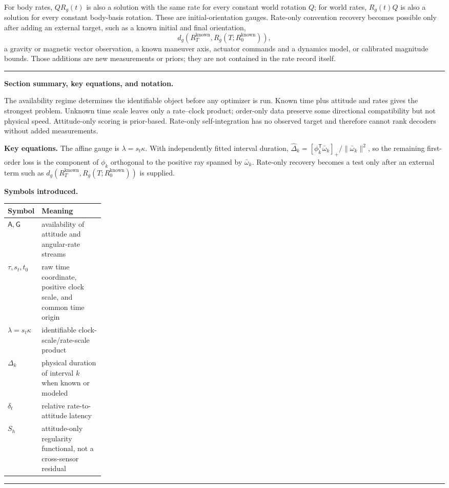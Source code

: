 \documentclass[11pt]{article}
\newenvironment{sectionrecap}
{\par\medskip\begingroup\small\noindent\rule{\linewidth}{0.4pt}\par
\smallskip\noindent\textbf{Section summary, key equations, and notation.}\par\smallskip}
{\par\smallskip\noindent\rule{\linewidth}{0.4pt}\par\endgroup\medskip}
\begin{document}
    For body rates, $Q R_g(t)$ is also a solution with the same rate for every constant world
    rotation $Q$; for world rates, $R_g(t)Q$ is also a solution for every constant body-basis
    rotation. These are initial-orientation gauges. Rate-only convention recovery becomes
    possible only after adding an external target, such as a known initial and final
    orientation,
    \begin{equation}
        d_g\!\left(R_T^{\mathrm{known}},R_g(T;R_0^{\mathrm{known}})\right),
    \end{equation}
    a gravity or magnetic vector observation, a known maneuver axis, actuator commands and a
    dynamics model, or calibrated magnitude bounds. Those additions are new measurements or
    priors; they are not contained in the rate record itself.

    \begin{sectionrecap}
        The availability regime determines the identifiable object before any optimizer is run.
        Known time plus attitude and rates gives the strongest problem. Unknown time scale leaves
        only a rate--clock product; order-only data preserve some directional compatibility but
        not physical speed. Attitude-only scoring is prior-based. Rate-only self-integration has
        no observed target and therefore cannot rank decoders without added measurements.

        \noindent\textbf{Key equations.}
        The affine gauge is \(\lambda=s_t\kappa\). With independently fitted interval duration,
        \(\widehat\Delta_k=[\phi_k^{\mathsf T}\bar\omega_k]_+/\|\bar\omega_k\|^2\), so the
        remaining first-order loss is the component of \(\phi_k\) orthogonal to the positive ray
        spanned by \(\bar\omega_k\). Rate-only recovery becomes a test only after an external
        term such as \(d_g(R_T^{\mathrm{known}},R_g(T;R_0^{\mathrm{known}}))\) is supplied.

        \noindent\textbf{Symbols introduced.}
        \par\noindent\begin{tabularx}{\linewidth}{@{}p{0.22\linewidth}Y@{}}
\toprule
Symbol & Meaning \\
\midrule
$\mathsf A,\mathsf G$ & availability of attitude and angular-rate streams \\
$\tau,s_t,t_0$ & raw time coordinate, positive clock scale, and common time origin \\
$\lambda=s_t\kappa$ & identifiable clock-scale/rate-scale product \\
$\Delta_k$ & physical duration of interval $k$ when known or modeled \\
$\delta_t$ & relative rate-to-attitude latency \\
$S_h$ & attitude-only regularity functional, not a cross-sensor residual \\
\bottomrule
        \end{tabularx}
    \end{sectionrecap}
\end{document}
